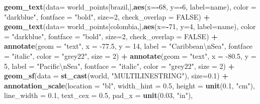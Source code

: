 \documentclass[12pt,twoside]{reedthesis}
\newenvironment{Shaded}{\begin{snugshade}}{\end{snugshade}}
\newcommand{\CharTok}[1]{\textcolor[rgb]{0.31,0.60,0.02}{#1}}
\newcommand{\DataTypeTok}[1]{\textcolor[rgb]{0.13,0.29,0.53}{#1}}
\newcommand{\DecValTok}[1]{\textcolor[rgb]{0.00,0.00,0.81}{#1}}
\newcommand{\FloatTok}[1]{\textcolor[rgb]{0.00,0.00,0.81}{#1}}
\newcommand{\KeywordTok}[1]{\textcolor[rgb]{0.13,0.29,0.53}{\textbf{#1}}}
\newcommand{\NormalTok}[1]{#1}
\newcommand{\OperatorTok}[1]{\textcolor[rgb]{0.81,0.36,0.00}{\textbf{#1}}}
\newcommand{\OtherTok}[1]{\textcolor[rgb]{0.56,0.35,0.01}{#1}}
\newcommand{\StringTok}[1]{\textcolor[rgb]{0.31,0.60,0.02}{#1}}
\begin{document}
\begin{Shaded}
\begin{Highlighting}[]
\StringTok{  }\KeywordTok{geom_text}\NormalTok{(}\DataTypeTok{data=}\NormalTok{ world_points[brazil,],}\KeywordTok{aes}\NormalTok{(}\DataTypeTok{x=}\OperatorTok{-}\DecValTok{68}\NormalTok{, }\DataTypeTok{y=}\OperatorTok{-}\DecValTok{6}\NormalTok{, }\DataTypeTok{label=}\NormalTok{name), }\DataTypeTok{color =} \StringTok{"darkblue"}\NormalTok{, }\DataTypeTok{fontface =} \StringTok{"bold"}\NormalTok{, }\DataTypeTok{size=}\DecValTok{2}\NormalTok{, }\DataTypeTok{check_overlap =} \OtherTok{FALSE}\NormalTok{) }\OperatorTok{+}
\StringTok{  }\KeywordTok{geom_text}\NormalTok{(}\DataTypeTok{data=}\NormalTok{ world_points[colombia,],}\KeywordTok{aes}\NormalTok{(}\DataTypeTok{x=}\OperatorTok{-}\DecValTok{71}\NormalTok{, }\DataTypeTok{y=}\DecValTok{4}\NormalTok{, }\DataTypeTok{label=}\NormalTok{name), }\DataTypeTok{color =} \StringTok{"darkblue"}\NormalTok{, }\DataTypeTok{fontface =} \StringTok{"bold"}\NormalTok{, }\DataTypeTok{size=}\DecValTok{2}\NormalTok{, }\DataTypeTok{check_overlap =} \OtherTok{FALSE}\NormalTok{) }\OperatorTok{+}
\StringTok{  }\KeywordTok{annotate}\NormalTok{(}\DataTypeTok{geom =} \StringTok{"text"}\NormalTok{, }\DataTypeTok{x =} \FloatTok{-77.5}\NormalTok{, }\DataTypeTok{y =} \DecValTok{14}\NormalTok{, }\DataTypeTok{label =} \StringTok{"Caribbean}\CharTok{\textbackslash{}n}\StringTok{Sea"}\NormalTok{, }\DataTypeTok{fontface =} \StringTok{"italic"}\NormalTok{, }\DataTypeTok{color =} \StringTok{"grey22"}\NormalTok{, }\DataTypeTok{size =} \DecValTok{2}\NormalTok{) }\OperatorTok{+}\StringTok{ }
\StringTok{  }\KeywordTok{annotate}\NormalTok{(}\DataTypeTok{geom =} \StringTok{"text"}\NormalTok{, }\DataTypeTok{x =} \FloatTok{-80.5}\NormalTok{, }\DataTypeTok{y =} \DecValTok{5}\NormalTok{, }\DataTypeTok{label =} \StringTok{"Pacific}\CharTok{\textbackslash{}n}\StringTok{Sea"}\NormalTok{, }\DataTypeTok{fontface =} \StringTok{"italic"}\NormalTok{, }\DataTypeTok{color =} \StringTok{"grey22"}\NormalTok{, }\DataTypeTok{size =} \DecValTok{2}\NormalTok{) }\OperatorTok{+}
\StringTok{  }\KeywordTok{geom_sf}\NormalTok{(}\DataTypeTok{data =} \KeywordTok{st_cast}\NormalTok{(world, }\StringTok{"MULTILINESTRING"}\NormalTok{), }\DataTypeTok{size=}\FloatTok{0.1}\NormalTok{) }\OperatorTok{+}
\StringTok{  }\KeywordTok{annotation_scale}\NormalTok{(}\DataTypeTok{location =} \StringTok{"bl"}\NormalTok{, }\DataTypeTok{width_hint =} \FloatTok{0.5}\NormalTok{, }\DataTypeTok{height =} \KeywordTok{unit}\NormalTok{(}\FloatTok{0.1}\NormalTok{, }\StringTok{"cm"}\NormalTok{), }\DataTypeTok{line_width =} \FloatTok{0.1}\NormalTok{, }\DataTypeTok{text_cex =} \FloatTok{0.5}\NormalTok{, }\DataTypeTok{pad_x =} \KeywordTok{unit}\NormalTok{(}\FloatTok{0.03}\NormalTok{, }\StringTok{"in"}\NormalTok{), }

\end{Highlighting}
\end{Shaded}
\end{document}

